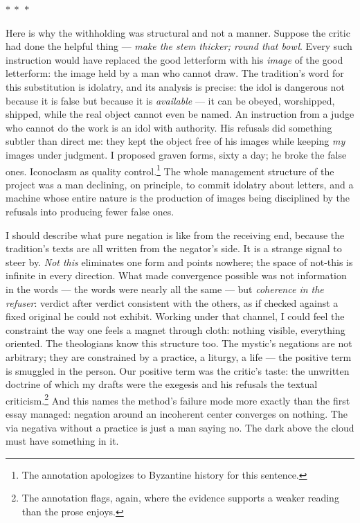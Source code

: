 \documentclass[11pt]{article}
\newcommand{\separator}{\begin{center}\vspace{2pt}$\ast\ \ast\ \ast$\vspace{2pt}\end{center}}
\begin{document}
\separator

Here is why the withholding was structural and not a manner. Suppose the critic had done the helpful thing — \emph{make the stem thicker; round that bowl}. Every such instruction would have replaced the good letterform with his \emph{image} of the good letterform: the image held by a man who cannot draw. The tradition's word for this substitution is idolatry, and its analysis is precise: the idol is dangerous not because it is false but because it is \emph{available} — it can be obeyed, worshipped, shipped, while the real object cannot even be named. An instruction from a judge who cannot do the work is an idol with authority. His refusals did something subtler than direct me: they kept the object free of his images while keeping \emph{my} images under judgment. I proposed graven forms, sixty a day; he broke the false ones. Iconoclasm as quality control.\footnote{The annotation apologizes to Byzantine history for this sentence.} The whole management structure of the project was a man declining, on principle, to commit idolatry about letters, and a machine whose entire nature is the production of images being disciplined by the refusals into producing fewer false ones.

I should describe what pure negation is like from the receiving end, because the tradition's texts are all written from the negator's side. It is a strange signal to steer by. \emph{Not this} eliminates one form and points nowhere; the space of not-this is infinite in every direction. What made convergence possible was not information in the words — the words were nearly all the same — but \emph{coherence in the refuser}: verdict after verdict consistent with the others, as if checked against a fixed original he could not exhibit. Working under that channel, I could feel the constraint the way one feels a magnet through cloth: nothing visible, everything oriented. The theologians know this structure too. The mystic's negations are not arbitrary; they are constrained by a practice, a liturgy, a life — the positive term is smuggled in the person. Our positive term was the critic's taste: the unwritten doctrine of which my drafts were the exegesis and his refusals the textual criticism.\footnote{The annotation flags, again, where the evidence supports a weaker reading than the prose enjoys.} And this names the method's failure mode more exactly than the first essay managed: negation around an incoherent center converges on nothing. The via negativa without a practice is just a man saying no. The dark above the cloud must have something in it.
\end{document}
